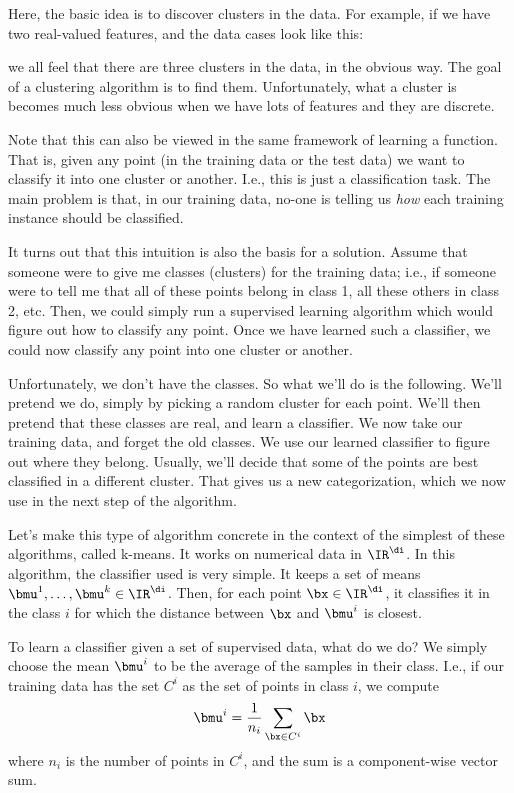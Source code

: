 Here, the basic idea is to discover clusters in the data.  For example, if
we have two real-valued features, and the data cases look like this:


we all feel that there are three clusters in the data, in the obvious way.
The goal of a clustering algorithm is to find them.  Unfortunately, what a
cluster is becomes much less obvious when we have lots of features and they
are discrete.

Note that this can also be viewed in the same framework of learning a
function.  That is, given any point (in the training data or the test
data) we want to classify it into one cluster or another.  I.e., this
is just a classification task.  The main problem is that, in our
training data, no-one is telling us {\em how\/} each training instance
should be classified.

It turns out that this intuition is also the basis for a solution.
Assume that someone were to give me classes (clusters) for the
training data; i.e., if someone were to tell me that all of these
points belong in class 1, all these others in class 2, etc.  Then, we
could simply run a supervised learning algorithm which would figure
out how to classify any point.  Once we have learned such a
classifier, we could now classify any point into one cluster or
another.  

Unfortunately, we don't have the classes.  So what we'll do is the
following.  We'll pretend we do, simply by picking a random cluster
for each point.  We'll then pretend that these classes are real, and
learn a classifier.  We now take our training data, and forget the
old classes.  We use our learned classifier to figure out where they
belong.  Usually, we'll decide that some of the points are best
classified in a different cluster.  That gives us a new
categorization, which we now use in the next step of the algorithm.

Let's make this type of algorithm concrete in the context of the
simplest of these algorithms, called k-means.  It works on numerical
data in $\IR^\di$.  In this algorithm, the classifier used is very
simple.  It keeps a set of means $\bmu^1,\ldots,\bmu^k \in \IR^\di$.
Then, for each point $\bx \in \IR^\di$, it classifies it in the class
$i$ for which the distance between $\bx$ and $\bmu^i$ is closest.

To learn a classifier given a set of supervised data, what do we do?
We simply choose the mean $\bmu^i$ to be the average of the samples in
their class.  I.e., if our training data has the set $C^i$ as the set
of points in class $i$, we compute 
\[
  \bmu^i = \frac{1}{n_i} \sum_{\bx \in C^i} \bx
\]
where $n_i$ is the number of points in $C^i$, and the sum is a
component-wise vector sum.

